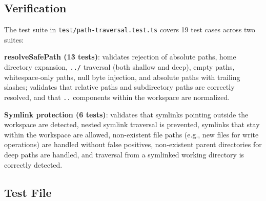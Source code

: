 \subsection*{Verification}
The test suite in \texttt{test/path-traversal.test.ts} covers 19 test cases across two suites:

\textbf{resolveSafePath (13 tests)}: validates rejection of absolute paths, home directory expansion, \texttt{../} traversal (both shallow and deep), empty paths, whitespace-only paths, null byte injection, and absolute paths with trailing slashes; validates that relative paths and subdirectory paths are correctly resolved, and that \texttt{..} components within the workspace are normalized.

\textbf{Symlink protection (6 tests)}: validates that symlinks pointing outside the workspace are detected, nested symlink traversal is prevented, symlinks that stay within the workspace are allowed, non-existent file paths (e.g., new files for write operations) are handled without false positives, non-existent parent directories for deep paths are handled, and traversal from a symlinked working directory is correctly detected.

\subsection*{Test File}

